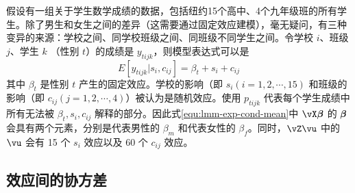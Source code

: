 \documentclass[UTF8]{ctexart}
\begin{document}
假设有一组关于学生数学成绩的数据，包括纽约15个高中、4个九年级班的所有学生。除了男生和女生之间的差异（这需要通过固定效应建模），毫无疑问，有三种变异的来源：学校之间、同学校班级之间、同班级不同学生之间。令学校 $ i $、班级 $ j $、学生 $ k $ （性别 $ t $）的成绩是 $ y_{tijk} $，则模型表达式可以是
\begin{equation}
    E[y_{tijk}|s_i,c_{ij}] = \beta_t + s_i + c_{ij}
\end{equation}
其中 $ \beta_t $ 是性别 $ t $ 产生的固定效应。学校的影响（即 $ s_i(i=1, 2, \cdots, 15) $ 和班级的影响（即 $ c_{ij}(j=1, 2, \cdots, 4) $）被认为是随机效应。使用 $ p_{tijk} $ 代表每个学生成绩中所有无法被 $ \beta_t, s_i, c_{ij} $ 解释的部分。因此式\eqref{equ:lmm-exp-cond-mean}中 $ \vX\vbeta $ 的 $ \bm{\beta} $ 会具有两个元素，分别是代表男性的 $ \beta_m $ 和代表女性的 $ \beta_f $。同时，$ \vZ\vu $ 中的 $ \vu $ 会有 15 个 $ s_i $ 效应以及 60 个 $ c_{ij} $ 效应。

\subsection{效应间的协方差}
\end{document}
